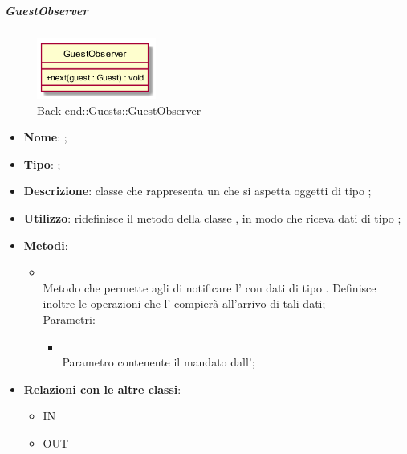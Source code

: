 \hypertarget{GuestObserver_label}{\subparagraph{GuestObserver}}
\begin{figure}[h]
	\centering
	\includegraphics[width=0.35\textwidth,height=\textheight,keepaspectratio]{images/ClassGuestObserver.png}
	\caption{Back-end::Guests::GuestObserver}
\end{figure}
\begin{itemize}
	\item \textbf{Nome}: ;
	\item \textbf{Tipo}: ;
	\item \textbf{Descrizione}: classe che rappresenta un  che si aspetta oggetti di tipo ;
	\item \textbf{Utilizzo}: ridefinisce il metodo  della classe , in modo che riceva dati di tipo ;
	\item \textbf{Metodi}:
	\begin{itemize}
		\item[]  \\		Metodo che permette agli  di notificare l' con dati di tipo . Definisce inoltre le operazioni che l' compierà all'arrivo di tali dati;\\
		Parametri:
		\begin{itemize}
			\item {} \\
			Parametro contenente il  mandato dall';
		\end{itemize}
	\end{itemize}
	\item \textbf{Relazioni con le altre classi}:
	\begin{itemize}
		\item IN \hyperlink{GuestObservable_label}{}
		\item OUT \hyperlink{Guest_label}{}
	\end{itemize}
\end{itemize}
\FloatBarrier

